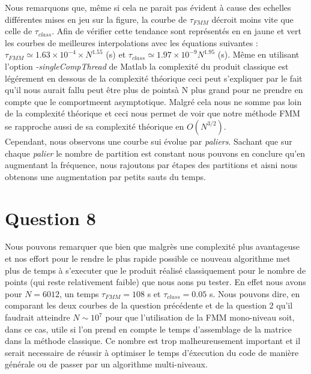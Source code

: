 \documentclass[10pt]{article}
\begin{document}
\begin{multicols}{2}
Nous remarquons que, même si cela ne parait pas évident à cause des echelles différentes mises en jeu sur la figure, la courbe de $\tau_{FMM}$ décroit moins vite que celle de $\tau_{class}$. Afin de vérifier cette tendance sont représentés en en jaune et vert les courbes de meilleures interpolations avec les équations suivantes : $\tau_{FMM} \simeq 1.63\times10^{-4} \times N^{1.55}$ (s) et $\tau_{class} \simeq 1.97\times10^{-9}  N^{1.95}$ (s). Même en utilisant l'option \textit{-singleCompThread} de Matlab la complexité du produit classique est légérement en dessous de la complexité théorique ceci peut s'expliquer par le fait qu'il nous aurait fallu peut être plus de pointsà N plus grand pour ne prendre en compte que le comportmeent asymptotique. Malgré cela nous ne somme pas loin de la complexité théorique et ceci nous permet de voir que notre méthode FMM se rapproche aussi de sa complexité théorique en $O(N^{3/2})$. \\
\indent
Cependant, nous observons une courbe sui évolue par \textit{paliers}. Sachant que sur chaque \textit{palier} le nombre de partition est constant nous pouvons en conclure qu'en augmentant la fréquence, nous rajoutons par étapes des partitions et aisni nous obtenons une augmentation par petits sauts du temps. 


\vspace*{22pt}
\section*{Question 8}

Nous pouvons remarquer que bien que malgrès une complexité plus avantageuse et nos effort pour le rendre le plus rapide possible ce nouveau algorithme met plus de temps à s'executer que le produit réalisé classiquement pour le nombre de points (qui reste relativement faible) que nous aons pu tester. En effet nous avons pour $N = 6012$, un temps $\tau_{FMM} = 108$ s et $\tau_{class} = 0.05$ s. Nous pouvons dire, en comparant les deux courbes de la question précédente  et de la question 2 qu'il faudrait atteindre $N \sim 10^{7}$ pour que l'utilisation de la FMM mono-niveau soit, dans ce cas, utile si l'on prend en compte le temps d'assemblage de la matrice dans la méthode classique. Ce nombre est trop malheureusement important et il serait necessaire de réussir à optimiser le temps d'éxecution du code de manière générale ou de passer par un algorithme multi-niveaux.

\end{multicols}
\end{document}
